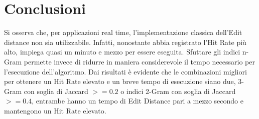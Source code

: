 \documentclass{article}
\begin{document}
\clearpage

\section{Conclusioni}
Si osserva che, per applicazioni real time, l'implementazione classica dell'Edit distance non sia utilizzabile. Infatti, nonostante abbia registrato l'Hit Rate più alto, impiega quasi un minuto e mezzo per essere eseguita. \newline
Sfuttare gli indici n-Gram  permette invece di ridurre in maniera considerevole il tempo necessario per l'esecuzione dell'algoritmo. Dai risultati è evidente che le combinazioni migliori per ottenere un Hit Rate elevato e un breve tempo di esecuzione siano due, 3-Gram con soglia di Jaccard $>=0.2$ o indici 2-Gram con soglia di Jaccard $>=0.4$, entrambe hanno un tempo di Edit Distance pari a mezzo secondo e mantengono un Hit Rate elevato.
\end{document}
